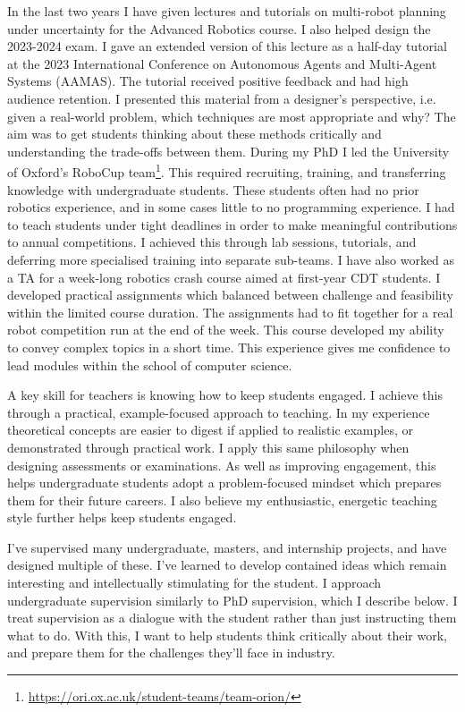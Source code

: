 \documentclass[12pt]{article}
\begin{document}
In the last two years I have given lectures and tutorials on multi-robot planning under uncertainty for the Advanced Robotics course.
%
I also helped design the 2023-2024 exam.
%
I gave an extended version of this lecture as a half-day tutorial at the 2023 International Conference on Autonomous Agents and Multi-Agent Systems (AAMAS).
%
The tutorial received positive feedback and had high audience retention.
%
I presented this material from a designer's perspective, i.e. given a real-world problem, which techniques are most appropriate and why?
%
The aim was to get students thinking about these methods critically and understanding the trade-offs between them.
%
During my PhD I led the University of Oxford's RoboCup team\footnote{\url{https://ori.ox.ac.uk/student-teams/team-orion/}}.
%
This required recruiting, training, and transferring knowledge with undergraduate students.
%
These students often had no prior robotics experience, and in some cases little to no programming experience.
%
I had to teach students under tight deadlines in order to make meaningful contributions to annual competitions. 
%
I achieved this through lab sessions, tutorials, and deferring more specialised training into separate sub-teams.
%
%
I have also worked as a TA for a week-long robotics crash course aimed at first-year CDT students.
%
I developed practical assignments which balanced between challenge and feasibility within the limited course duration.
%
The assignments had to fit together for a real robot competition run at the end of the week.
%
This course developed my ability to convey complex topics in a short time.
%
This experience gives me confidence to lead modules within the school of computer science.

A key skill for teachers is knowing how to keep students engaged.
%
I achieve this through a practical, example-focused approach to teaching.
%
In my experience theoretical concepts are easier to digest if applied to realistic examples, or demonstrated through practical work.
%
I apply this same philosophy when designing assessments or examinations.
%
As well as improving engagement, this helps undergraduate students adopt a problem-focused mindset which prepares them for their future careers.
%
I also believe my enthusiastic, energetic teaching style further helps keep students engaged.

I've supervised many undergraduate, masters, and internship projects, and have designed multiple of these.
%
I've learned to develop contained ideas which remain interesting and intellectually stimulating for the student.
%
I approach undergraduate supervision similarly to PhD supervision, which I describe below.
%
I treat supervision as a dialogue with the student rather than just instructing them what to do.
%
With this, I want to help students think critically about their work, and prepare them for the challenges they'll face in industry.
\end{document}
